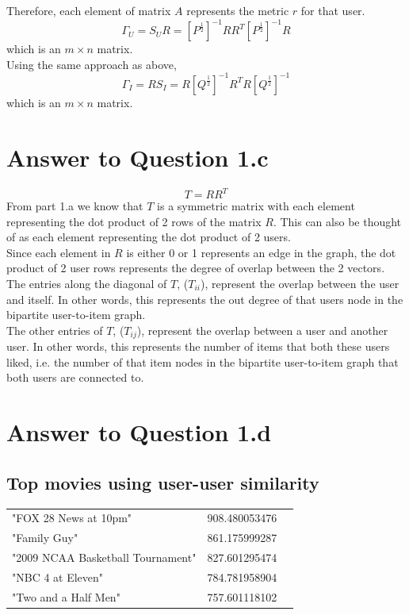 \documentclass[11pt]{article}
\begin{document}
{Therefore, each element of matrix $A$ represents the metric $r$ for that user.
$$\Gamma_U = S_UR = [P^{\frac{1}{2}}]^{-1} RR^T [P^{\frac{1}{2}}]^{-1}R$$ which is an $m \times n$ matrix.\\

Using the same approach as above, $$\Gamma_I = RS_I = R[Q^{\frac{1}{2}}]^{-1} R^TR [Q^{\frac{1}{2}}]^{-1}$$ which is an $m \times n$ matrix.

\pagebreak[4]
\section*{Answer to Question 1.c}
$$T = RR^T$$
From part 1.a we know that $T$ is a symmetric matrix with each element representing the dot product of 2 rows of the matrix $R$. This can also be thought of as each element representing the dot product of 2 users.\\

Since each element in $R$ is either 0 or 1 represents an edge in the graph, the dot product of 2 user rows represents the degree of overlap between the 2 vectors.\\

The entries along the diagonal of $T$,  ($T_{ii}$), represent the overlap between the user and itself. In other words, this represents the out degree of that users node in the bipartite user-to-item graph.\\

The other entries of $T$,  ($T_{ij}$), represent the overlap between a user and another user. In other words, this represents the number of items that both these users liked, i.e. the number of that item nodes in the bipartite user-to-item graph that both users are connected to.

\pagebreak[4]
\section*{Answer to Question 1.d}

\subsection*{Top movies using user-user similarity}
\begin{tabular}{ l c r }
"FOX 28 News at 10pm" & 908.480053476\\
"Family Guy" & 861.175999287\\
"2009 NCAA Basketball Tournament" & 827.601295474\\
"NBC 4 at Eleven" & 784.781958904\\
"Two and a Half Men" & 757.601118102\\
\end{tabular}

}
\end{document}
